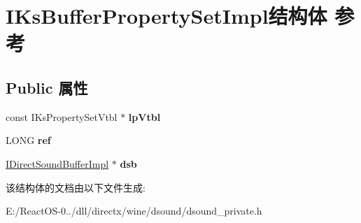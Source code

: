 \hypertarget{struct_i_ks_buffer_property_set_impl}{}\section{I\+Ks\+Buffer\+Property\+Set\+Impl结构体 参考}
\label{struct_i_ks_buffer_property_set_impl}
\subsection*{Public 属性}
\begin{DoxyCompactItemize}
\item 
\mbox{\label{struct_i_ks_buffer_property_set_impl_ab12f4ea1187945b2e25008530f6cdfb5}} 
const I\+Ks\+Property\+Set\+Vtbl $\ast$ {\bfseries lp\+Vtbl}
\item 
\mbox{\label{struct_i_ks_buffer_property_set_impl_a76694bb4574e1787807830d13ca84e49}} 
L\+O\+NG {\bfseries ref}
\item 
\mbox{\label{struct_i_ks_buffer_property_set_impl_a75b06325fb3f0152d31bb6345321e242}} 
\hyperlink{struct_i_direct_sound_buffer_impl}{I\+Direct\+Sound\+Buffer\+Impl} $\ast$ {\bfseries dsb}
\end{DoxyCompactItemize}


该结构体的文档由以下文件生成\+:\begin{DoxyCompactItemize}
\item 
E\+:/\+React\+O\+S-\/0../dll/directx/wine/dsound/dsound\+\_\+private.\+h\end{DoxyCompactItemize}
